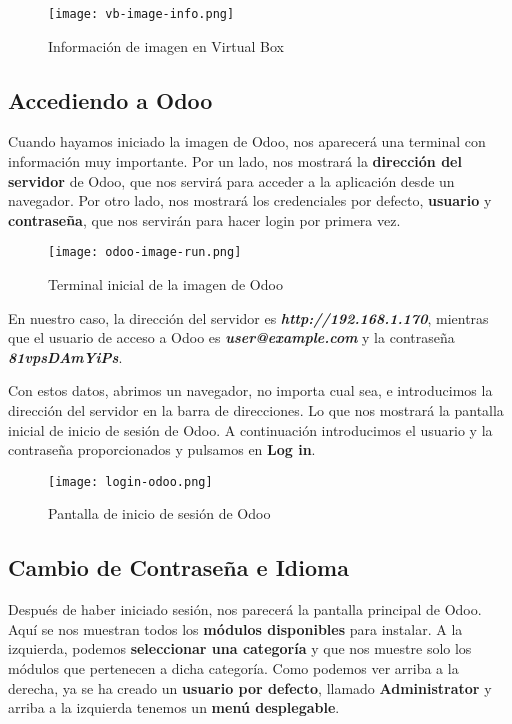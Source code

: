 \begin{figure}[ht]
    \centering
    \texttt{[image: vb-image-info.png]}
    \caption{Información de imagen en Virtual Box}
\end{figure}


\subsection{Accediendo a Odoo}
Cuando hayamos iniciado la imagen de Odoo, nos aparecerá una terminal con información muy importante. Por un lado, nos mostrará la \textbf{dirección del servidor} de Odoo, que nos servirá para acceder a la aplicación desde un navegador. Por otro lado, nos mostrará los credenciales por defecto, \textbf{usuario} y \textbf{contraseña}, que nos servirán para hacer login por primera vez.

\begin{figure}[ht]
    \centering
    \texttt{[image: odoo-image-run.png]}
    \caption{Terminal inicial de la imagen de Odoo}
\end{figure}

En nuestro caso, la dirección del servidor es \textbf{\textit{http://192.168.1.170}}, mientras que el usuario de acceso a Odoo es \textbf{\textit{user@example.com}} y la contraseña \textbf{\textit{81vpsDAmYiPs}}.

Con estos datos, abrimos un navegador, no importa cual sea, e introducimos la dirección del servidor en la barra de direcciones. Lo que nos mostrará la pantalla inicial de inicio de sesión de Odoo. A continuación introducimos el usuario y la contraseña proporcionados y pulsamos en \textbf{Log in}.


\begin{figure}[ht]
    \centering
    \texttt{[image: login-odoo.png]}
    \caption{Pantalla de inicio de sesión de Odoo}
\end{figure}

\subsection{Cambio de Contraseña e Idioma}
Después de haber iniciado sesión, nos parecerá la pantalla principal de Odoo. Aquí se nos muestran todos los\textbf{ módulos disponibles} para instalar. A la izquierda, podemos \textbf{seleccionar una categoría} y que nos muestre solo los módulos que pertenecen a dicha categoría. Como podemos ver arriba a la derecha, ya se ha creado un \textbf{usuario por defecto}, llamado \textbf{Administrator} y arriba a la izquierda tenemos un \textbf{menú desplegable}.

